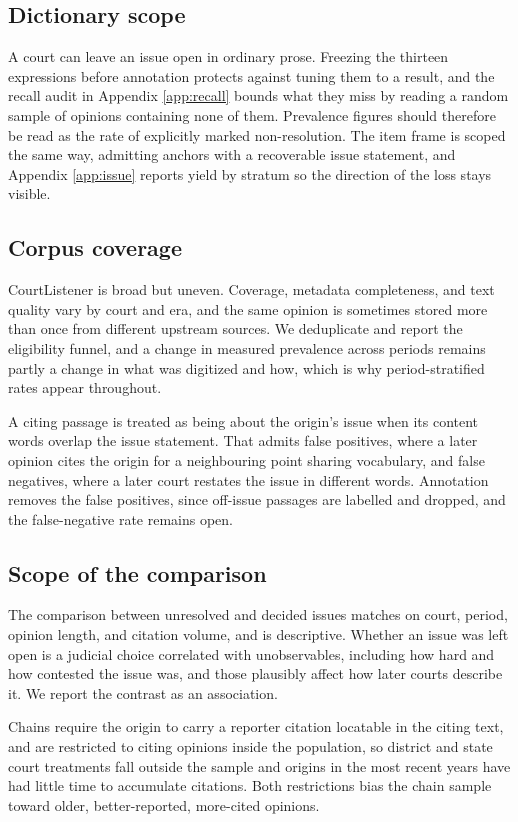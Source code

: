 \subsection*{Dictionary scope} A court can leave an issue open in ordinary prose.
Freezing the thirteen expressions before annotation protects against tuning them
to a result, and the recall audit in Appendix \ref{app:recall} bounds what they
miss by reading a random sample of opinions containing none of them. Prevalence
figures should therefore be read as the rate of explicitly marked non-resolution.
The item frame is scoped the same way, admitting anchors with a recoverable issue
statement, and Appendix \ref{app:issue} reports yield by stratum so the direction
of the loss stays visible.

\subsection*{Corpus coverage} CourtListener is broad but uneven. Coverage,
metadata completeness, and text quality vary by court and era, and the same
opinion is sometimes stored more than once from different upstream sources. We
deduplicate and report the eligibility funnel, and a change in measured
prevalence across periods remains partly a change in what was digitized and how,
which is why period-stratified rates appear throughout.

A citing passage is treated as being about the origin's issue when its content
words overlap the issue statement. That admits false positives, where a later
opinion cites the origin for a neighbouring point sharing vocabulary, and false
negatives, where a later court restates the issue in different words. Annotation
removes the false positives, since off-issue passages are labelled and dropped,
and the false-negative rate remains open.

\subsection*{Scope of the comparison} The comparison between unresolved and
decided issues matches on court, period, opinion length, and citation volume, and
is descriptive. Whether an issue was left open is a judicial choice correlated
with unobservables, including how hard and how contested the issue was, and those
plausibly affect how later courts describe it. We report the contrast as an
association.

Chains require the origin to carry a reporter citation locatable in the citing
text, and are restricted to citing opinions inside the population, so district
and state court treatments fall outside the sample and origins in the most recent
years have had little time to accumulate citations. Both restrictions bias the
chain sample toward older, better-reported, more-cited opinions.

